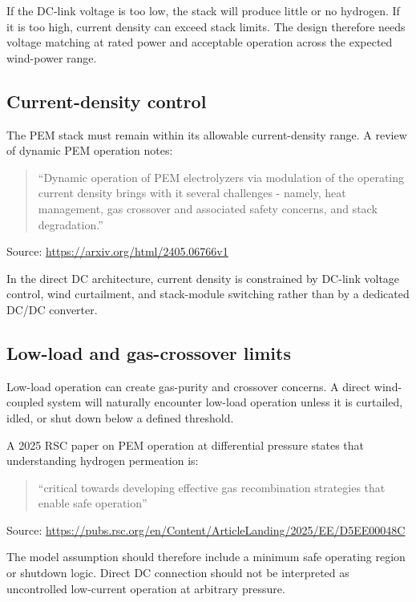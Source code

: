 \documentclass[
  letterpaper,
  DIV=11,
  numbers=noendperiod]{scrartcl}
\begin{document}
If the DC-link voltage is too low, the stack will produce little or no
hydrogen. If it is too high, current density can exceed stack limits.
The design therefore needs voltage matching at rated power and
acceptable operation across the expected wind-power range.

\subsection{Current-density control}\label{current-density-control}

The PEM stack must remain within its allowable current-density range. A
review of dynamic PEM operation notes:

\begin{quote}
``Dynamic operation of PEM electrolyzers via modulation of the operating
current density brings with it several challenges - namely, heat
management, gas crossover and associated safety concerns, and stack
degradation.''
\end{quote}

Source: \url{https://arxiv.org/html/2405.06766v1}

In the direct DC architecture, current density is constrained by DC-link
voltage control, wind curtailment, and stack-module switching rather
than by a dedicated DC/DC converter.

\subsection{Low-load and gas-crossover
limits}\label{low-load-and-gas-crossover-limits}

Low-load operation can create gas-purity and crossover concerns. A
direct wind-coupled system will naturally encounter low-load operation
unless it is curtailed, idled, or shut down below a defined threshold.

A 2025 RSC paper on PEM operation at differential pressure states that
understanding hydrogen permeation is:

\begin{quote}
``critical towards developing effective gas recombination strategies
that enable safe operation''
\end{quote}

Source:
\url{https://pubs.rsc.org/en/Content/ArticleLanding/2025/EE/D5EE00048C}

The model assumption should therefore include a minimum safe operating
region or shutdown logic. Direct DC connection should not be interpreted
as uncontrolled low-current operation at arbitrary pressure.
\end{document}

